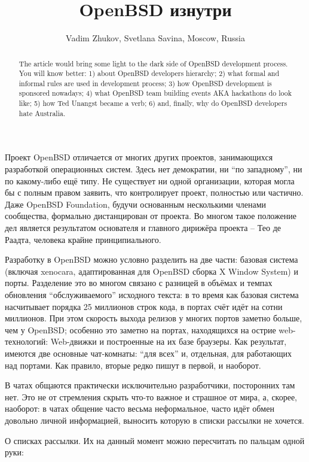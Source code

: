 \documentclass[10pt, a5paper]{article}
\begin{document}
\title{OpenBSD изнутри}
\author{Vadim Zhukov, Svetlana Savina, Moscow, Russia}
\maketitle
\begin{abstract}
The article would bring some light to the dark side of OpenBSD development process. You will know better: 1) about OpenBSD developers hierarchy; 2) what formal and informal rules are used in development process; 3) how OpenBSD development is sponsored nowadays; 4) what OpenBSD team building events AKA hackathons do look like; 5) how Ted Unangst became a verb; 6) and, finally, why do OpenBSD developers hate Australia.
\end{abstract}
Проект OpenBSD отличается от многих других проектов, занимающихся разработкой операционных систем. Здесь нет демократии, ни ``по западному'', ни по какому-либо ещё типу. Не существует ни одной организации, которая могла бы с полным правом заявить, что контролирует проект, полностью или частично. Даже OpenBSD Foundation, будучи основанным несколькими членами сообщества, формально дистанцирован от проекта. Во многом такое положение дел является результатом основателя и главного дирижёра проекта -- Тео де Раадта, человека крайне принципиального.

Разработку в OpenBSD можно условно разделить на две части: базовая система (включая xenocara, адаптированная для OpenBSD сборка X Window System) и порты. Разделение это во многом связано с разницей в объёмах и темпах обновления ``обслуживаемого'' исходного текста: в то время как базовая система насчитывает порядка 25 миллионов строк кода, в портах счёт идёт на сотни миллионов. При этом скорость выхода релизов у многих портов заметно больше, чем у OpenBSD; особенно это заметно на портах, находящихся на острие web-технологий: Web-движки и построенные на их базе браузеры. Как результат, имеются две основные чат-комнаты: ``для всех'' и, отдельная, для работающих над портами. Как правило, вторые редко пишут в первой, и наоборот.

В чатах общаются практически исключительно разработчики, посторонних там нет. Это не от стремления скрыть что-то важное и страшное от мира, а, скорее, наоборот: в чатах общение часто весьма неформальное, часто идёт обмен довольно личной информацией, выносить которую в списки рассылки не хочется.

О списках рассылки. Их на данный момент можно пересчитать по пальцам одной руки:
\end{document}
